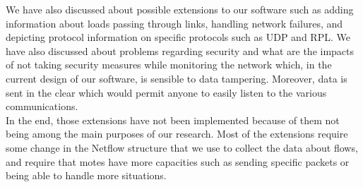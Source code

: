 We have also discussed about possible extensions to our software such as adding information about loads passing through links, handling network failures, and depicting protocol information on specific protocols such as UDP and RPL. We have also discussed about problems regarding security and what are the impacts of not taking security measures while monitoring the network which, in the current design of our software, is sensible to data tampering. Moreover, data is sent in the clear which would permit anyone to easily listen to the various communications.\\

In the end, those extensions have not been implemented because of them not being among the main purposes of our research. Most of the extensions require some change in the Netflow structure that we use to collect the data about flows, and require that motes have more capacities such as sending specific packets or being able to handle more situations.\\
